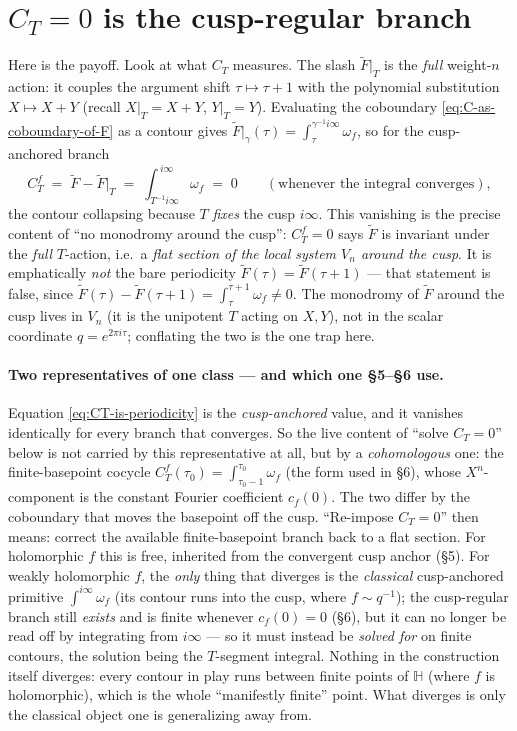 \documentclass[11pt]{article}
\newcommand{\HH}{\mathbb{H}}
\newcommand{\Vn}{V_n}
\newcommand{\Eich}{\widetilde{F}}
\begin{document}
\section{$C_T = 0$ is the cusp-regular branch}

Here is the payoff. Look at what $C_T$ measures. The slash $\Eich|_T$ is
the \emph{full} weight-$n$ action: it couples the argument shift
$\tau \mapsto \tau+1$ with the polynomial substitution $X \mapsto X+Y$
(recall $X|_T = X+Y$, $Y|_T = Y$). Evaluating the coboundary
\eqref{eq:C-as-coboundary-of-F} as a contour gives
$\Eich|_\gamma(\tau) = \int_\tau^{\gamma^{-1}i\infty}\omega_f$, so for the
cusp-anchored branch
\begin{equation}\label{eq:CT-is-periodicity}
  C^f_T \;=\; \Eich - \Eich\big|_T
        \;=\; \int_{T^{-1}i\infty}^{\,i\infty}\omega_f \;=\; 0
  \qquad(\text{whenever the integral converges}),
\end{equation}
the contour collapsing because $T$ \emph{fixes} the cusp $i\infty$. This
vanishing is the precise content of ``no monodromy around the cusp'':
$C^f_T = 0$ says $\Eich$ is invariant under the \emph{full} $T$-action,
i.e.\ a \emph{flat section of the local system $\Vn$ around the cusp}. It
is emphatically \emph{not} the bare periodicity $\Eich(\tau) =
\Eich(\tau+1)$ --- that statement is false, since
$\Eich(\tau) - \Eich(\tau+1) = \int_\tau^{\tau+1}\omega_f \neq 0$. The
monodromy of $\Eich$ around the cusp lives in $\Vn$ (it is the unipotent
$T$ acting on $X,Y$), not in the scalar coordinate $q = e^{2\pi i\tau}$;
conflating the two is the one trap here.

\paragraph{Two representatives of one class --- and which one \S5--\S6
use.} Equation \eqref{eq:CT-is-periodicity} is the \emph{cusp-anchored}
value, and it vanishes identically for every branch that converges. So the
live content of ``solve $C_T = 0$'' below is not carried by this
representative at all, but by a \emph{cohomologous} one: the
finite-basepoint cocycle $C^f_T(\tau_0) = \int_{\tau_0-1}^{\tau_0}\omega_f$
(the form used in \S6), whose $X^n$-component is the constant Fourier
coefficient $c_f(0)$. The two differ by the coboundary that moves the
basepoint off the cusp. ``Re-impose $C_T = 0$'' then means: correct the
available finite-basepoint branch back to a flat section. For holomorphic
$f$ this is free, inherited from the convergent cusp anchor (\S5). For
weakly holomorphic $f$, the \emph{only} thing that diverges is the
\emph{classical} cusp-anchored primitive $\int^{i\infty}\omega_f$ (its
contour runs into the cusp, where $f \sim q^{-1}$); the cusp-regular branch
still \emph{exists} and is finite whenever $c_f(0) = 0$ (\S6), but it can
no longer be read off by integrating from $i\infty$ --- so it must instead
be \emph{solved for} on finite contours, the solution being the $T$-segment
integral. Nothing in the construction itself diverges: every contour in
play runs between finite points of $\HH$ (where $f$ is holomorphic), which
is the whole ``manifestly finite'' point. What diverges is only the
classical object one is generalizing away from.
\end{document}
